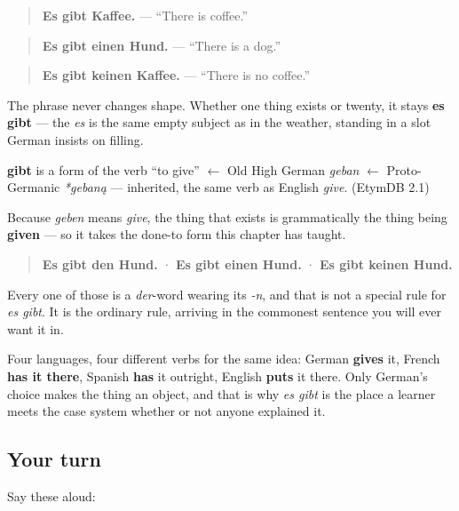 \begin{quote}
\textbf{Es gibt Kaffee.} — \textquotedblleft{}There is coffee.\textquotedblright{}
\end{quote}

\begin{quote}
\textbf{Es gibt einen Hund.} — \textquotedblleft{}There is a dog.\textquotedblright{}
\end{quote}

\begin{quote}
\textbf{Es gibt keinen Kaffee.} — \textquotedblleft{}There is no coffee.\textquotedblright{}
\end{quote}

The phrase never changes shape. Whether one thing exists or twenty, it stays \textbf{es gibt} — the \emph{es} is the same empty subject as in the weather, standing in a slot German insists on filling.

\begin{cousinweb}
\textbf{gibt} is a form of the verb \textquotedblleft{}to give\textquotedblright{} $\leftarrow$ Old High German \emph{geban} $\leftarrow$ Proto-Germanic \emph{*gebaną} — inherited, the same verb as English \emph{give}. (EtymDB 2.1)
\end{cousinweb}

\begin{grammarlens}[title={Grammar Lens: what follows it is an object}]
Because \emph{geben} means \emph{give}, the thing that exists is grammatically the thing being \textbf{given} — so it takes the done-to form this chapter has taught.

\begin{quote}
\textbf{Es gibt den Hund.} · \textbf{Es gibt einen Hund.} · \textbf{Es gibt keinen Hund.}
\end{quote}

Every one of those is a \emph{der}-word wearing its \emph{-n}, and that is not a special rule for \emph{es gibt}. It is the ordinary rule, arriving in the commonest sentence you will ever want it in.

Four languages, four different verbs for the same idea: German \textbf{gives} it, French \textbf{has it there}, Spanish \textbf{has} it outright, English \textbf{puts} it there. Only German's choice makes the thing an object, and that is why \emph{es gibt} is the place a learner meets the case system whether or not anyone explained it.
\end{grammarlens}

\subsection*{Your turn}
Say these aloud:

